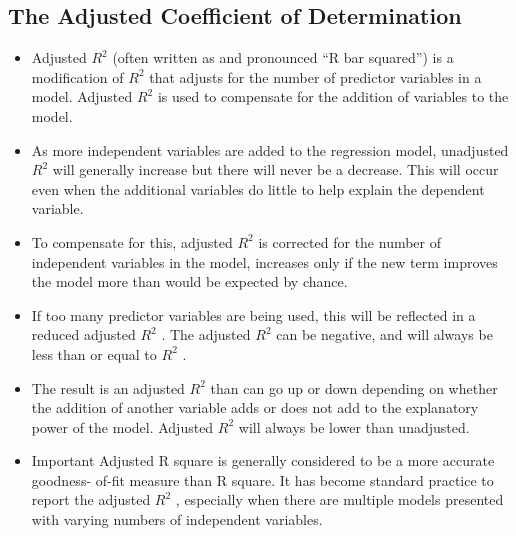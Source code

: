\documentclass[]{report}
\begin{document}
\subsection{The Adjusted Coefficient of Determination}
\begin{itemize}
\item Adjusted $R^2$ (often written as and pronounced “R bar squared”) is a modification of $R^2$
that adjusts for the number of predictor variables in a model. Adjusted $R^2$ is used to
compensate for the addition of variables to the model.
\item As more independent variables are added to the regression model, unadjusted $R^2$ will
generally increase but there will never be a decrease. This will occur even when the
additional variables do little to help explain the dependent variable.
\item To compensate for this, adjusted $R^2$ is corrected for the number of independent variables
in the model, increases only if the new term improves the model more than would be
expected by chance.
\item If too many predictor variables are being used, this will be reflected in a reduced adjusted
$R^2$ . The adjusted $R^2$ can be negative, and will always be less than or equal to $R^2$ .
\item The result is an adjusted $R^2$ than can go up or down depending on whether the addition
of another variable adds or does not add to the explanatory power of the model. Adjusted
$R^2$ will always be lower than unadjusted.
\item Important Adjusted R square is generally considered to be a more accurate goodness-
of-fit measure than R square. It has become standard practice to report the adjusted $R^2$ ,
especially when there are multiple models presented with varying numbers of independent
variables.
\end{itemize}
\end{document}
